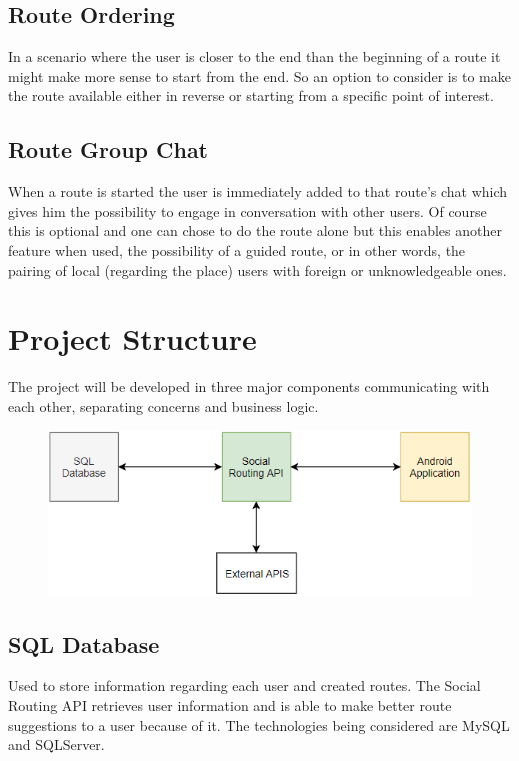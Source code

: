 \documentclass{article}
\begin{document}
        \subsection*{Route Ordering}            
            In a scenario where the user is closer to the end than the beginning of a route it 
            might make more sense to start from the end. 
            So an option to consider is to make the route available either in reverse or starting from a specific point of interest.       

        \subsection*{Route Group Chat}
            When a route is started the user is immediately added to that route's chat which gives him the possibility to engage in conversation with other users.
            Of course this is optional and one can chose to do the route alone but this enables another feature when used, the possibility of a guided route,
            or in other words, the pairing of local (regarding the place) users with foreign or unknowledgeable ones.
        

    \section{Project Structure}
        The project will be developed in three major components communicating with each other, separating concerns and business logic.
        
        \begin{figure}[h]
            \includegraphics[width=\textwidth]{images/dblocos.png}
        \end{figure} 

        \subsection*{SQL Database}  
            Used to store information regarding each user and created routes. The Social Routing API retrieves user information and is able
            to make better route suggestions to a user because of it. The technologies being considered are MySQL and SQLServer.    
\end{document}
